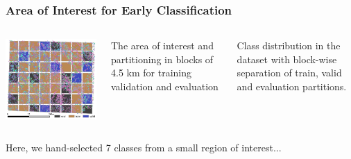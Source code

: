 \begin{frame}
\frametitle{Area of Interest for Early Classification}

\begin{columns}
	\centering\includegraphics[width=\textwidth]{images/holl.pdf}
	
	The area of interest and partitioning in blocks of 4.5 km for training validation and evaluation
	
	
	{Class distribution in the dataset with block-wise separation of train, valid and evaluation partitions.}
	
\end{columns}
\end{frame}



{
	\begin{frame}[plain]
	\vfill
	\begin{center}
		\Huge\color{tumblue}
		
		Here, we hand-selected 7 classes from a small region of interest...
	\end{center}
	
	
\end{frame}
}

